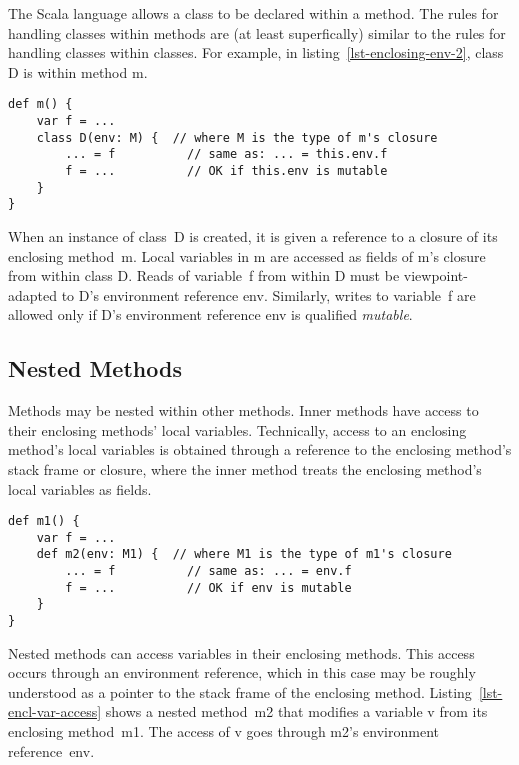 The Scala language allows a class to be declared within a method.
The rules for handling classes within methods are (at least superfically)
similar to the rules for handling classes within classes. For example,
in listing~\ref{lst-enclosing-env-2}, class {\cd D} is within method {\cd m}.
\begin{lstlisting}[caption={Accessing an Enclosing Environment (2)},float={htp},label={lst-enclosing-env-2}]
def m() {
	var f = ...
	class D(env: M) {  // where M is the type of m's closure
		... = f          // same as: ... = this.env.f
		f = ...          // OK if this.env is mutable
	}
}
\end{lstlisting}
When an instance of class~{\cd D} is created, it is given a reference
to a closure of its enclosing method~{\cd m}.
Local variables in {\cd m} are accessed as fields of {\cd m}'s closure
from within class {\cd D}.
Reads of variable~{\cd f} from within {\cd D} must be viewpoint-adapted to
{\cd D}'s environment reference {\cd env}.
Similarly, writes to variable~{\cd f} are allowed only if {\cd D}'s environment
reference {\cd env} is qualified {\em mutable}.

\subsection{Nested Methods}
\label{sec-nested-methods}

Methods may be nested within other methods.
Inner methods have access to their enclosing methods' local variables.
Technically, access to an enclosing method's local variables is obtained through
a reference to the enclosing method's stack frame or closure,
where the inner method treats the enclosing method's local variables as fields.

\begin{lstlisting}[caption={Accessing an Enclosing Environment (3)},float={htp},label={lst-enclosing-env-3}]
def m1() {
	var f = ...
	def m2(env: M1) {  // where M1 is the type of m1's closure
		... = f          // same as: ... = env.f
		f = ...          // OK if env is mutable
	}
}
\end{lstlisting}


Nested methods can access variables in their enclosing methods.
This access occurs through an environment reference,
which in this case may be roughly understood as a pointer to the stack
frame of the enclosing method.
Listing~\ref{lst-encl-var-access} shows a nested method~{\cd m2}
that modifies a variable {\cd v} from its enclosing method~{\cd m1}.
The access of {\cd v} goes through {\cd m2}'s environment reference~{\cd env}.

